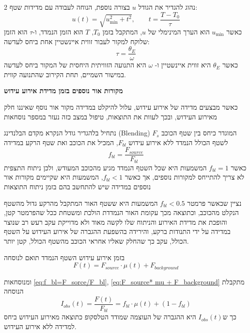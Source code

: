 \documentclass{article}
\begin{document}
\begin{multicols}{2}
נהוג להגדיר את הגודל $u$ בצורה נוספת, הנוחה לעבודה עם מדידות שטף:
\begin{equation}
    u(t) = \sqrt{u_{\min}^2 + t^2}, \qquad t = \frac{T-T_0}{\tau}
\end{equation}
כאשר $u_{\min}$ הוא הערך המינימלי של $u$, המתקבל בזמן $T_0$,
$T$ הוא הזמן הנמדד, ו-$\tau$ הוא הזמן שלוקח למקור לעבור זווית איינשטיין אחת ביחס לעדשה:
\begin{equation}
    \tau = \frac{\theta_E}{\omega}
\end{equation}
כאשר
$\theta_E$
היא זווית איינשטיין ו-
$\omega$
היא התנועה הזוויתית היחסית של המקור
ביחס לעדשה במישור השמיים, תחת הקירוב שהתנועה קווית.

\textbf{מקורות אור נוספים בזמן מדידת אירוע עידוש}

כאשר מבצעים מדידה של אירוע עידוש, עלול להיקלט במדידה מקור אור נוסף שאיננו חלק מאירוע העידוש, ובכך לעוות את התוצאות, טיפול במצב כזה נעזר במספר נוסחאות

נתחיל בלהגדיר גודל הנקרא מקדם הבלנדינג (Blending) 
המוגדר כיחס בין שטף הכוכב $F_s$  לשטף הכולל הנמדד ללא אירוע עידוש $F_{bl}$, המכיל את הכוכב ואת שטף הרקע במדידה
\begin{equation}
    f_{bl} = \frac{F_{source}}{F_{bl}}
    \label{eq:f_bl=F_sorce/F_bl}
\end{equation}
כאשר $f_{bl} = 1$ המשמעות היא שכל השטף הנמדד מגיע מהכוכב המעודש, ולכן ניתוח התצפית לא צריך להתייחס למקורות נוספים, אך כאשר $f_{bl}<1$, המשמעות היא שקיימים מקורות אור נוספים במדידה שיש להתחשב בהם בזמן ניתוח התוצאות

נציין שכאשר פרמטר $f_{bl}<0.5$ המשמעות היא ששטף האור המתקבל מהרקע גדול מהשטף הנקלט מהכוכב, וכתוצאה מכך עקומת האור הנמדדת הולכת ומשטחת ככל שהפרמטר קטן, והופכת את מדידת האירוע והניתוח שלו לקשה מאוד ולא מדוייקת עקב רעש רב שנוצר במדידה על ידי התנודות ברקע, והירידה בהשפעת ההגברה של אירוע העידוש על השטף הכולל, עקב כך שהחלק שאליו אחראי הכוכב מהשטף הכולל, קטן יותר.

בזמן אירוע עידוש השטף הנמדד תואם לנוסחה
\begin{equation}
    F(t) = F_{source} \cdot \mu (t) +F_{background}
    \label{eq:F_source* mu + F_background}
\end{equation}


ומנוסחאות
\ref{eq:f_bl=F_sorce/F_bl},
\ref{eq:F_source* mu + F_background}
מתקבלת הנוסחה
\begin{equation}
    I_{obs}(t) = \frac{F(t)}{F_{bl}} = f_{bl}\cdot\mu(t) + (1-f_{bl})
\end{equation}
כך ש$I_{obs}(t)$ היא ההגברה של העוצמה שמודד הטלסקופ כתוצאה מאירוע העידוש ביחס למדידה ללא אירוע העידוש.




\end{multicols}
\end{document}

